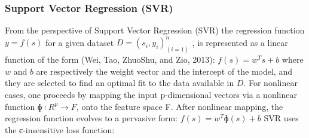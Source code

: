 \documentclass[review]{elsarticle}
\begin{document}
\subsubsection{Support Vector Regression (SVR)}
From the perspective of Support Vector Regression (SVR) the regression function $y = f(s)$ for a given dataset $D ={(s_i,y_i ) }_(i=1)^n$ , is represented as a linear function of the form (Wei, Tao, ZhuoShu, and Zio, 2013):
$f(s)=w^T s+b$
where 	$w$ and $b$ are respectively the weight vector and the intercept of the model, and they are selected to find an optimal fit to the data available in $D$.
For nonlinear cases, one proceeds by mapping the input p-dimensional vectors via a nonlinear function $ɸ∶R^p→F$, onto the feature space F.  After nonlinear mapping, the regression function evolves to a pervasive form:
$f(s)=w^T ɸ(s)+b$
SVR uses the є-insensitive loss function:
\end{document}
